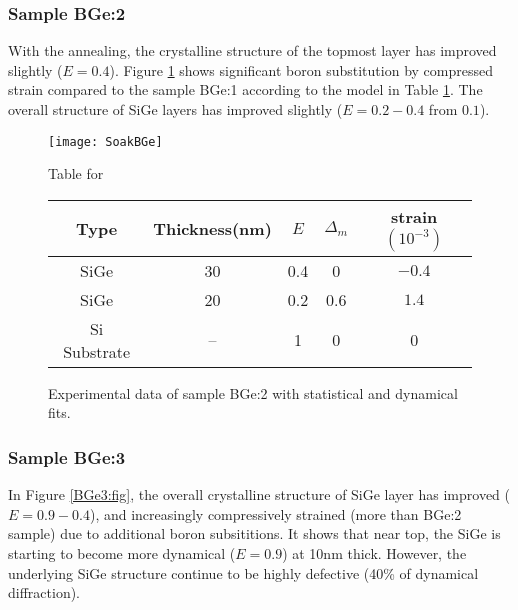 \subsubsection{Sample BGe:2}

With the annealing, the crystalline structure of the topmost layer has improved slightly ($E=0.4$). Figure \ref{BGe2:fig} shows significant boron substitution by compressed strain compared to the sample BGe:1 according to the model in Table \ref{BGe2:fig}.  The overall structure of SiGe layers has improved slightly ($E=0.2-0.4$ from $ 0.1$).

\begin{figure}[ht]%
\caption{Experimental data of sample BGe:2 with statistical and dynamical fits.}
\label{BGe2:fig}
\begin{minipage}{\linewidth}
\texttt{[image: SoakBGe]}
\end{minipage}
\begin{minipage}{\linewidth}
\centering
\vspace{10pt}
Table for \\
\begin{tabular}[htbp]{@{}c|cccc@{}}
    \hline
  Type & Thickness(nm) & $E$ & $\Delta_m$ & strain $(10^{-3})$ \\
    \hline
  SiGe & 30 & 0.4 & 0 & $-0.4 $  \\
  SiGe & 20 & 0.2 & 0.6 & $1.4 $  \\
  Si Substrate & -- & 1 & 0 & 0
  \end{tabular}
\end{minipage}
\end{figure}

\subsubsection{Sample BGe:3}

In Figure \ref{BGe3:fig}, the overall crystalline structure of SiGe layer has improved ($E=0.9-0.4$), and increasingly compressively strained (more than BGe:2 sample) due to additional boron subsititions.  It shows that near top, the SiGe is starting to become more dynamical ($E=0.9$) at 10nm thick.  However, the underlying SiGe structure continue to be highly defective (40\% of dynamical diffraction).

